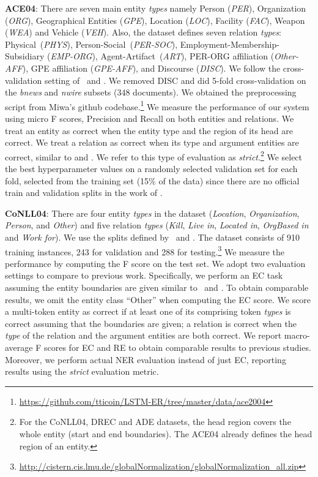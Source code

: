 \documentclass[review]{elsarticle}
\begin{document}
\noindent \textbf{ACE04}: There are
seven main entity \emph{types} namely Person (\emph{PER}), Organization
(\emph{ORG}), Geographical Entities (\emph{GPE}),
Location (\emph{LOC}), Facility (\emph{FAC}), Weapon (\emph{WEA})
and Vehicle (\emph{VEH}). Also, the dataset defines seven relation \emph{types}: Physical~(\emph{PHYS}),  Person-Social~(\emph{PER-SOC}),
Employment-Membership-Subsidiary
(\emph{EMP-ORG}), Agent-Artifact~(\emph{ART}), PER-ORG affiliation (\emph{Other-AFF}),
GPE affiliation (\emph{GPE-AFF}), and Discourse
(\emph{DISC}). We follow the cross-validation setting of~\cite{li:14} and \cite{miwa:16}. We
removed DISC and did 5-fold cross-validation on the \emph{bnews} and
\emph{nwire} subsets (348 documents). We obtained the preprocessing script from Miwa's github codebase.\footnote{\url{https://github.com/tticoin/LSTM-ER/tree/master/data/ace2004}} We measure the performance of our system using micro F scores, Precision and
Recall on both entities and relations. We treat
an entity as correct when the entity type and the region of
its head are correct. We treat a relation as correct
when its type and argument entities are correct, similar to \cite{miwa:16} and \cite{katiyar:17}. We refer to this type of evaluation as \emph{strict}.\footnote{For the CoNLL04, DREC and ADE datasets, the head region covers the whole entity (start and end boundaries). The ACE04 already defines the head region of an entity.} We select the best hyperparameter values on a randomly selected validation set for each fold, selected from the training set (15\% of the data) since there are no official train and validation splits in the work of \cite{miwa:16}.

\noindent \textbf{CoNLL04}: There are four entity \emph{types} in the dataset (\emph{Location}, \emph{Organization}, \emph{Person},
and \emph{Other}) and five relation \emph{types} (\emph{Kill}, \emph{Live in},
\emph{Located in}, \emph{OrgBased in} and \emph{Work for}). We use the splits defined by~\cite{gupta:16} and \cite{heike:17}. The dataset consists of 910 training instances, 243 for validation and 288 for testing.\footnote{\url{http://cistern.cis.lmu.de/globalNormalization/globalNormalization_all.zip}\label{foot:adel_code_url}} We measure the performance by computing the F score on the test set. We adopt two evaluation settings to compare to previous work. Specifically, we perform an EC task assuming the entity boundaries are given similar to~\cite{gupta:16} and \cite{heike:17}. To obtain comparable results, we omit the entity class ``Other'' when computing the EC score. We score a multi-token entity as correct if
at least one of its comprising token \emph{types} is correct assuming that the boundaries are given; a relation is correct when the \emph{type} of the relation and the argument entities are both correct. We report macro-average F scores for EC and RE to obtain comparable results to previous studies. Moreover, we perform actual NER evaluation instead of just EC, reporting results using the \emph{strict} evaluation metric. 
\end{document}

